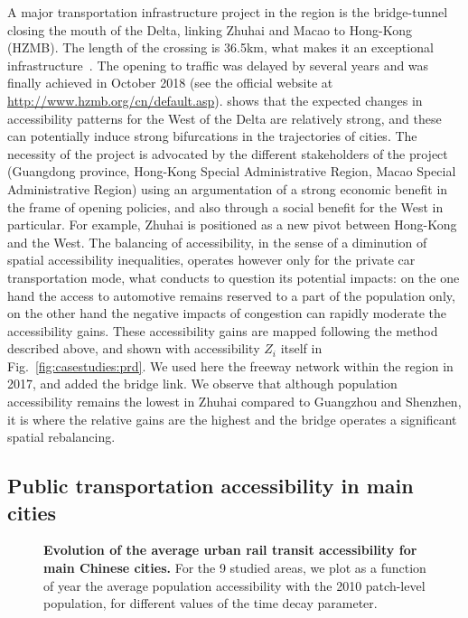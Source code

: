 A major transportation infrastructure project in the region is the bridge-tunnel closing the mouth of the Delta, linking Zhuhai and Macao to Hong-Kong (HZMB). The length of the crossing is 36.5km, what makes it an exceptional infrastructure~\citep{hussain2011hong}. The opening to traffic was delayed by several years and was finally achieved in October 2018 (see the official website at \url{http://www.hzmb.org/cn/default.asp}). \cite{zhou2016medium} shows that the expected changes in accessibility patterns for the West of the Delta are relatively strong, and these can potentially induce strong bifurcations in the trajectories of cities. The necessity of the project is advocated by the different stakeholders of the project (Guangdong province, Hong-Kong Special Administrative Region, Macao Special Administrative Region) using an argumentation of a strong economic benefit in the frame of opening policies, and also through a social benefit for the West in particular. For example, Zhuhai is positioned as a new pivot between Hong-Kong and the West. The balancing of accessibility, in the sense of a diminution of spatial accessibility inequalities, operates however only for the private car transportation mode, what conducts to question its potential impacts: on the one hand the access to automotive remains reserved to a part of the population only, on the other hand the negative impacts of congestion can rapidly moderate the accessibility gains. These accessibility gains are mapped following the method described above, and shown with accessibility $Z_i$ itself in Fig.~\ref{fig:casestudies:prd}. We used here the freeway network within the region in 2017, and added the bridge link. We observe that although population accessibility remains the lowest in Zhuhai compared to Guangzhou and Shenzhen, it is where the relative gains are the highest and the bridge operates a significant spatial rebalancing.






\subsection{Public transportation accessibility in main cities}

\begin{figure}
	\caption{\textbf{Evolution of the average urban rail transit accessibility for main Chinese cities.} For the 9 studied areas, we plot as a function of year the average population accessibility with the 2010 patch-level population, for different values of the time decay parameter.\label{fig:tcaccessavg}}
\end{figure}


